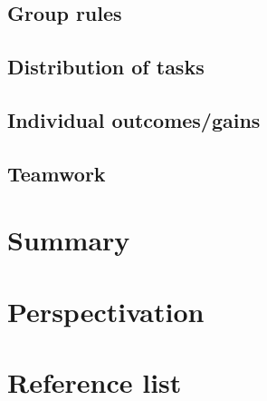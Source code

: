 \documentclass[]{article}
\begin{document}
	\subsection{Group rules}
	
	\subsection{Distribution of tasks}
	
	\subsection{Individual outcomes/gains}
	
	\subsection{Teamwork}
	
\section{Summary}

\section{Perspectivation}

\section{Reference list}
\end{document}
